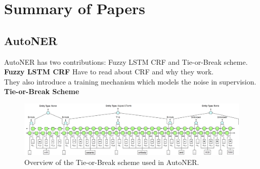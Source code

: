 \section{Summary of Papers}
\label{sec:summary}

\subsection{AutoNER}
AutoNER \cite{autoner} has two contributions: Fuzzy LSTM CRF and Tie-or-Break scheme.
\\

\noindent\textbf{Fuzzy LSTM CRF}
Have to read about CRF and why they work.
\\

They also introduce a training mechanism which models the noise in supervision. 
\noindent\textbf{Tie-or-Break Scheme}
\\

\begin{figure}[h!]
	\includegraphics[scale=0.3]{images/autoner_tie_or_break.png}
	\caption{\label{fig:tie_or_break}Overview of the Tie-or-Break scheme used in AutoNER.}
\end{figure}

